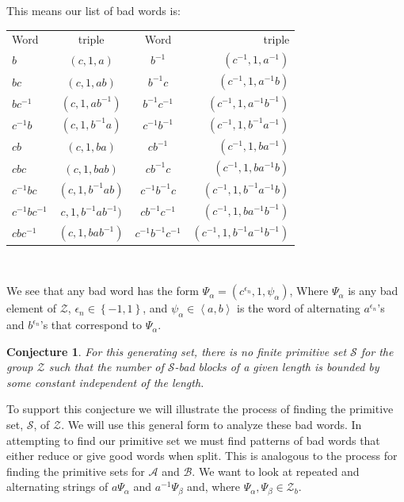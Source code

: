 \documentclass[11pt]{amsart}
\newtheorem{conjecture}[theorem]{Conjecture}
\theoremstyle{definition}
\theoremstyle{remark}
\numberwithin{equation}{section}
\begin{document}
This means our list of bad words is:\\

\begin{center}
\begin{tabular}{l | c | c | r }
Word & triple & Word & triple\\
$b$ & $(c,1,a)$ & $b^{-1}$ & $(c^{-1},1,a^{-1})$\\
$bc$ & $(c,1,ab)$ & $b^{-1}c$ & $(c^{-1},1,a^{-1}b)$\\
$bc^{-1}$ & $(c,1,ab^{-1})$ & $b^{-1}c^{-1}$ & $(c^{-1},1,a^{-1}b^{-1})$\\
$c^{-1}b$ & $(c,1,b^{-1}a)$ & $c^{-1}b^{-1}$ & $(c^{-1},1,b^{-1}a^{-1})$\\
$cb$ & $(c,1,ba)$ & $cb^{-1}$ & $(c^{-1},1,ba^{-1})$\\
$cbc$ & $(c,1,bab)$ & $cb^{-1}c$ & $(c^{-1},1,ba^{-1}b)$\\
$c^{-1}bc$ & $(c,1,b^{-1}ab)$ & $c^{-1}b^{-1}c$ & $(c^{-1},1,b^{-1}a^{-1}b)$\\
$c^{-1}bc^{-1}$ & $c,1,b^{-1}ab^{-1})$ & $cb^{-1}c^{-1}$ & $(c^{-1},1,ba^{-1}b^{-1})$\\
$cbc^{-1}$ & $(c,1,bab^{-1})$ & $c^{-1}b^{-1}c^{-1}$ & $(c^{-1},1,b^{-1}a^{-1}b^{-1})$\\
\end{tabular}\\
\end{center}

We see that any bad word has the form $\Psi_\alpha=(c^{\epsilon_n},1,\psi_\alpha)$, Where $\Psi_\alpha$ is any bad element of $\mathcal{Z}$, $\epsilon_n\in\left\{-1,1\right\}$, and $\psi_\alpha\in\left\langle a,b\right\rangle$ is the word of alternating $a^{\epsilon_n}$'s and $b^{\epsilon_n}$'s that correspond to $\Psi_\alpha$.  

\begin{conjecture}
For this generating set, there is no finite primitive set $\mathcal{S}$ for the group $\mathcal{Z}$ such that the number of $\mathcal{S}$-bad blocks of a given length is bounded by some constant independent of the length.
\end{conjecture}

To support this conjecture we will illustrate the process of finding the primitive set, $\mathcal{S}$, of $\mathcal{Z}$. We will use this general form to analyze these bad words.  In attempting to find our primitive set we must find patterns of bad words that either reduce or give good words when split.  This is analogous to the process for finding the primitive sets for $\mathcal{A}$ and $\mathcal{B}$. We want to look at repeated and alternating strings of $a\Psi_\alpha$ and $a^{-1}\Psi_\beta$ and, where $\Psi_\alpha,\Psi_\beta\in\mathcal{Z}_b$. 
 
\end{document}
